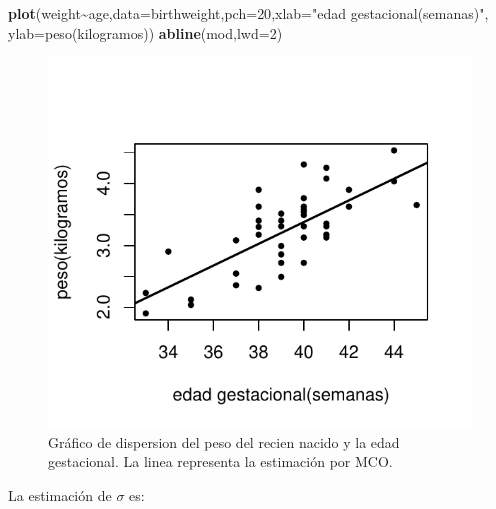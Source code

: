 \documentclass[
]{article}
\newenvironment{Shaded}{\begin{snugshade}}{\end{snugshade}}
\newcommand{\AttributeTok}[1]{\textcolor[rgb]{0.13,0.29,0.53}{#1}}
\newcommand{\DecValTok}[1]{\textcolor[rgb]{0.00,0.00,0.81}{#1}}
\newcommand{\FunctionTok}[1]{\textcolor[rgb]{0.13,0.29,0.53}{\textbf{#1}}}
\newcommand{\NormalTok}[1]{#1}
\newcommand{\SpecialCharTok}[1]{\textcolor[rgb]{0.81,0.36,0.00}{\textbf{#1}}}
\newcommand{\StringTok}[1]{\textcolor[rgb]{0.31,0.60,0.02}{#1}}
\begin{document}
\begin{Shaded}
\begin{Highlighting}[]
\FunctionTok{plot}\NormalTok{(weight}\SpecialCharTok{\textasciitilde{}}\NormalTok{age,}\AttributeTok{data=}\NormalTok{birthweight,}\AttributeTok{pch=}\DecValTok{20}\NormalTok{,}\AttributeTok{xlab=}\StringTok{"edad gestacional(semanas)"}\NormalTok{,}
     \AttributeTok{ylab=}\StringTok{\textquotesingle{}peso(kilogramos)\textquotesingle{}}\NormalTok{)}
\FunctionTok{abline}\NormalTok{(mod,}\AttributeTok{lwd=}\DecValTok{2}\NormalTok{)}
\end{Highlighting}
\end{Shaded}

\begin{figure}

{\centering \includegraphics{MLG1_files/figure-latex/FigMCO2-1} 

}

\caption{Gráfico de dispersion del peso del recien nacido y la edad gestacional. La linea representa la estimación por MCO.}\label{fig:FigMCO2}
\end{figure}

La estimación de \(\sigma\) es:

\begin{Shaded}
\end{Shaded}
\end{document}
